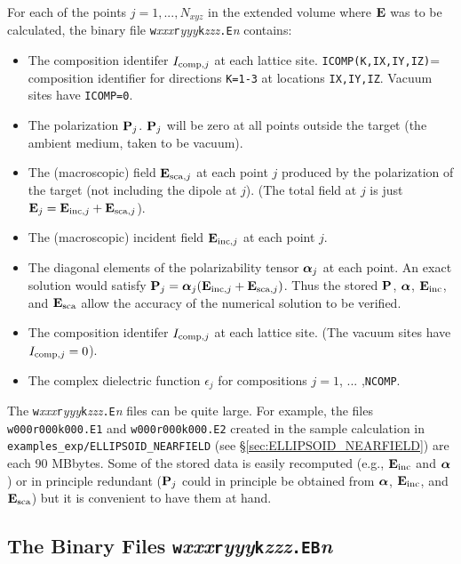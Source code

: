 For each of the points $j=1,...,N_{xyz}$ in the extended volume where
${\bf E}$ was to be calculated, the binary file 
{\tt w}{\it xxx}{\tt r}{\it yyy}{\tt k}{\it zzz}{\tt .E}{\it n}
contains:
\begin{itemize}
\item The composition identifer $I_{{\rm comp},j}$ at each lattice site.
      {\tt ICOMP(K,IX,IY,IZ)}= composition identifier for directions 
      {\tt K=1-3} at locations {\tt IX,IY,IZ}.
      Vacuum sites have {\tt ICOMP=0}.
\item The polarization ${\bf P}_j$.  ${\bf P}_j$ will be zero at all points
      outside the target (the ambient medium, taken to be vacuum).
\item The (macroscopic) field ${\bf E}_{{\rm sca},j}$ at each point $j$ 
      produced by the polarization of
      the target (not including the dipole at $j$).
      (The total field at $j$ is just 
      ${\bf E}_j={\bf E}_{{\rm inc},j}+{\bf E}_{{\rm sca},j}$).
\item The (macroscopic) incident field ${\bf E}_{{\rm inc},j}$ at each point $j$.
\item The diagonal elements of the polarizability tensor ${\boldsymbol{\alpha}}_j$
      at each point.  An exact solution would satisfy
      ${\bf P}_j={\boldsymbol{\alpha}}_j({\bf E}_{{\rm inc},j}+{\bf E}_{{\rm sca},j})$.
      Thus the stored ${\bf P}$, ${\boldsymbol{\alpha}}$, ${\bf E}_{\rm inc}$, and ${\bf E}_{\rm sca}$ allow
      the accuracy of the numerical solution to be verified.
\item The composition identifer $I_{{\rm comp},j}$ at each lattice site.
      (The vacuum sites have $I_{{\rm comp},j}=0$).
\item The complex dielectric function $\epsilon_j$ for compositions
      $j=1$, ... ,{\tt NCOMP}.
\end{itemize}
The {\tt w}{\it xxx}{\tt r}{\it yyy}{\tt k}{\it zzz}{\tt .E}{\it n}
files can be quite large.
For example, the files {\tt w000r000k000.E1} and {\tt w000r000k000.E2}
created in the sample calculation in {\tt examples\_exp/ELLIPSOID\_NEARFIELD}
(see \S\ref{sec:ELLIPSOID_NEARFIELD}) are each 90 MBbytes.
Some of the stored data is easily recomputed (e.g., ${\bf E}_{\rm inc}$ and
${\boldsymbol{\alpha}}$) or
in principle redundant (${\bf P}_j$ could in principle be obtained from
${\boldsymbol{\alpha}}$, ${\bf E}_{\rm inc}$, and ${\bf E}_{\rm sca}$) but it is convenient to have
them at hand.

\subsection{The Binary Files {\tt w}{\it xxx}{\tt r}{\it yyy}{\tt k}{\it zzz}{\tt .EB}{\it n}}

